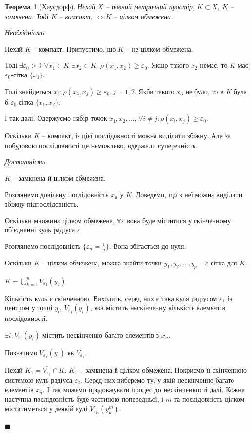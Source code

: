 \documentclass[14pt,twoside]{extreport}
\theoremstyle{mystyle}
\newtheorem{thm}{Теорема}
\renewenvironment{proof}{{\bfseries Доведення.}}{$\blacksquare$}
\numberwithin{equation}{chapter}
\begin{document}
\begin{thm}[Хаусдорф]
	Нехай $X$ -- повний метричний простір, $K \subset X$, $K$ -- замкнена. Тоді $K$ -- компакт, $\iff K$ -- цілком обмежена.
\end{thm}
\begin{proof}
	
	\emph{Необхідність}
	
	Нехай $K$ -- компакт.
	Припустимо, що $K $ -- не цілком обмежена.
	
	Тоді $\exists \varepsilon_0 > 0$ $\forall x_1 \in K$ $\exists x_2 \in K$: $\rho(x_1, x_2) \ge \varepsilon_0 $. Якщо такого $x_2$ немає, то $K$ має $\varepsilon_0 $-сітка $\{x_1\}$.
	
	Тоді знайдеться $x_3: \rho(x_3, x_j) \ge \varepsilon_0, j = \overline{1, 2} $. Якби такого $x_3 $ не було, то в $K$ була б $\varepsilon_0$-сітка $\{x_1, x_2\} $.
	
	І так далі. Одержуємо набір точок $x_1, x_2, \ldots $, $\forall i \ne j:  \rho(x_i, x_j) \geqslant \varepsilon_0 $.
	
	Оскільки $K$ -- компакт, із цієї послідовності можна виділити збіжну. Але за побудовою послідовності це неможливо, одержали суперечність.
	
	\emph{Достатність}
	
	$K$ -- замкнена й цілком обмежена.
	
	Розглянемо довільну послідовність $x_n$ у $K$. Доведемо, що з неї можна виділити збіжну підпослідовність.
	
	Оскільки множина цілком обмежена, $\forall \varepsilon$ вона буде міститися у скінченному об'єднанні куль радіуса $\varepsilon$.
	
	Розглянемо послідовність $\{\varepsilon_n = \frac 1 n \}$. Вона збігається до нуля.
	
	Оскільки $K$ -- цілком обмежена, можна знайти точки $y_1, y_2, \ldots, y_p $ -- $\varepsilon$-сітка для $K$.
	
	$K = \bigcup\limits_{k = 1}^{p} V_{\varepsilon_1}(y_k)$
	
	Кількість куль є скінченною. Виходить, серед них є така куля радіусом $\varepsilon_1$ із центром у точці $y_i$, $V_{\varepsilon_1}(y_i)$, яка містить нескінченну кількість елементів послідовності.
	
	$\exists i: V_{\varepsilon_1}(y_i)$ містить нескінченно багато елементів з $x_n$.
	
	Позначимо $V_{\varepsilon_1}(y_i) $ як $\overline{V_{\varepsilon_1}} $.
	
	Нехай $K_1 = \overline{V_{\varepsilon_1}} \cap K$. $K_1$ -- замкнена й цілком обмежена. Покриємо її скінченною системою куль радіуса $\varepsilon_2$. Серед них виберемо ту, у якій нескінченно багато елементів $x_n$. І так можемо продовжувати процес до нескінченності далі. Кожна наступна послідовність буде частиною попередньої, і $m$-та послідовність цілком міститиметься у деякій кулі $V_{\varepsilon_m}(y_k^m)$.
	

\end{proof}
\end{document}
